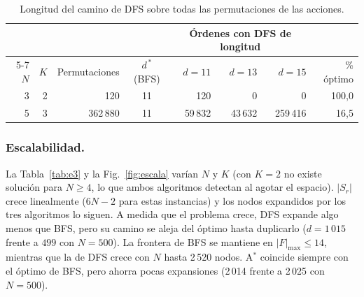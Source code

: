 \documentclass[runningheads]{llncs}
\newcommand{\Sr}{S_{r}}
\begin{document}
\begin{table}[t]
\centering
\caption{Longitud del camino de DFS sobre todas las permutaciones de las acciones.}
\label{tab:ordenes}
\setlength{\tabcolsep}{6pt}
\begin{tabular}{@{}rrrcrrrr@{}}
\toprule
 & & & & \multicolumn{3}{c}{Órdenes con DFS de longitud} & \\
\cmidrule(lr){5-7}
$N$ & $K$ & Permutaciones & $d^{\,*}$ (BFS) & $d=11$ & $d=13$ & $d=15$ & \% óptimo \\
\midrule
3 & 2 & 120 & 11 & 120 & 0 & 0 & 100{,}0 \\
5 & 3 & 362\,880 & 11 & 59\,832 & 43\,632 & 259\,416 & 16{,}5 \\
\bottomrule
\end{tabular}
\end{table}

\subsubsection{Escalabilidad.}
La Tabla~\ref{tab:e3} y la Fig.~\ref{fig:escala} varían $N$ y $K$ (con $K=2$ no
existe solución para $N\ge 4$, lo que ambos algoritmos detectan al agotar el
espacio). $|\Sr|$ crece linealmente ($6N-2$ para estas instancias) y los nodos
expandidos por los tres algoritmos lo siguen. A medida que el problema crece, DFS
expande algo menos que BFS, pero su camino se aleja del óptimo hasta duplicarlo
($d=1\,015$ frente a $499$ con $N=500$). La frontera de BFS se mantiene en
$|F|_{\max}\le 14$, mientras que la de DFS crece con $N$ hasta 2\,520 nodos.
A$^*$ coincide siempre con el óptimo de BFS, pero ahorra pocas expansiones
(2\,014 frente a 2\,025 con $N=500$).
\end{document}

